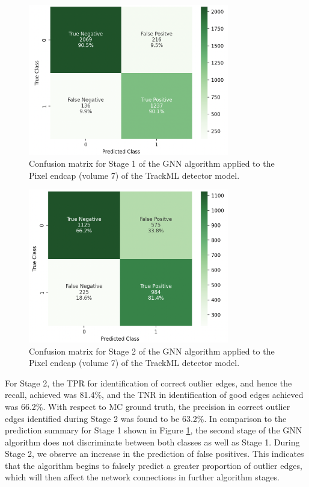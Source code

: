 \begin{figure}[htbp]
    \centering
    \includegraphics[width=0.78\textwidth]{images/7-results/confusion_matrix_endcap_stage_1.png}
    \caption{Confusion matrix for Stage 1 of the GNN algorithm applied to the Pixel endcap (volume 7) of the TrackML detector model.}
    \label{fig:confusion-matrix-endcap-stage-1}%
\end{figure}
  

\begin{figure}[htbp]
    \centering
    \includegraphics[width=0.78\textwidth]{images/7-results/confusion_matrix_endcap_stage_2.png}
    \caption{Confusion matrix for Stage 2 of the GNN algorithm applied to the Pixel endcap (volume 7) of the TrackML detector model.}
    \label{fig:confusion-matrix-endcap-stage-2}%
\end{figure}


For Stage 2, the TPR for identification of correct outlier edges, and hence the recall, achieved was 81.4\%, and the TNR in identification of good edges achieved was 66.2\%. With respect to MC ground truth, the precision in correct outlier edges identified during Stage 2 was found to be 63.2\%. In comparison to the prediction summary for Stage 1 shown in Figure \ref{fig:confusion-matrix-endcap-stage-1}, the second stage of the GNN algorithm does not discriminate between both classes as well as Stage 1. During Stage 2, we observe an increase in the prediction of false positives. This indicates that the algorithm begins to falsely predict a greater proportion of outlier edges, which will then affect the network connections in further algorithm stages.






